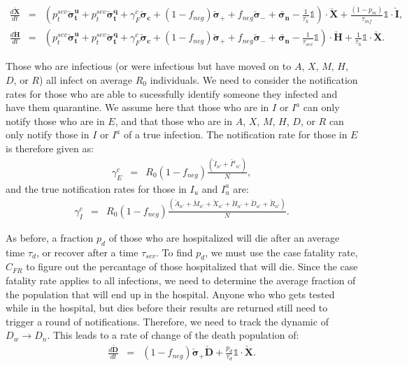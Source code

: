\documentclass[notitlepage, superscriptaddress]{revtex4-2}
\begin{document}
\begin{eqnarray}
%
\frac{d \boldsymbol{\check{X}}}{dt} &=& \left( p^{sev}_{t} \boldsymbol{\check{\sigma}^{u}_{t}} + p^{sev}_{t} \boldsymbol{\check{\sigma}^{q}_{t}} + \gamma^{c}_{F} \boldsymbol{\check{\sigma}_{c}} + (1-f_{neg}) \boldsymbol{\check{\sigma}_{+}} + f_{neg} \boldsymbol{\check{\sigma}_{-}} + \boldsymbol{\check{\sigma_{n}}} - \frac{1}{\tau_{h}} \mathbb{1} \right) \cdot \boldsymbol{\check{X}} + \frac{(1-p_{m})}{\tau_{inf}} \mathbb{1} \cdot \boldsymbol{\check{I}}, \\
% 
\frac{d \boldsymbol{\check{H}}}{dt} &=& \left( p^{sev}_{t} \boldsymbol{\check{\sigma}^{u}_{t}} + p^{sev}_{t} \boldsymbol{\check{\sigma}^{q}_{t}} + \gamma^{c}_{F} \boldsymbol{\check{\sigma}_{c}} + (1-f_{neg}) \boldsymbol{\check{\sigma}_{+}} + f_{neg} \boldsymbol{\check{\sigma}_{-}} + \boldsymbol{\check{\sigma_{n}}} - \frac{1}{\tau_{sev}} \mathbb{1} \right) \cdot \boldsymbol{\check{H}} + \frac{1}{\tau_{h}} \mathbb{1} \cdot \boldsymbol{\check{X}}.
\end{eqnarray}

Those who are infectious (or were infectious but have moved on to $A$, $X$, $M$, $H$, $D$, or $R$) all infect on average $R_{0}$ individuals. We need to consider the notification rates for those who are able to sucessfully identify someone they infected and have them quarantine. We assume here that those who are in $I$ or $I^{a}$ can only notify those who are in $E$, and that those who are in $A$, $X$, $M$, $H$, $D$, or $R$ can only notify those in $I$ or $I^{a}$ of a true infection. The notification rate for those in $E$ is therefore given as:
\begin{eqnarray}
\gamma^{c}_{E} &=& R_{0}(1-f_{neg}) \frac{(\check{I}_{n'} + \check{I^{a}}_{n'})}{N},
\end{eqnarray} 
and the true notification rates for those in $I_{u}$ and $I^{a}_{u}$ are:
\begin{eqnarray}
\gamma^{c}_{I} &=&  R_{0} (1-f_{neg}) \frac{(\check{A}_{n'} + \check{M}_{n'} + \check{X}_{n'} + \check{H}_{n'} + \check{D}_{n'} + \check{R}_{n'} )}{N}.
\end{eqnarray}   

As before, a fraction $p_{d}$ of those who are hospitalized will die after an average time $\tau_{d}$, or recover after a time $\tau_{sev}$. To find $p_{d}$, we must use the case fatality rate, $C_{FR}$ to figure out the percantage of those hospitalized that will die. Since the case fatality rate applies to all infections, we need to determine the average fraction of the population that will end up in the hospital. Anyone who who gets tested while in the hospital, but dies before their results are returned still need to trigger a round of notifications. Therefore, we need to track the dynamic of $D_{w} \rightarrow D_{n}$. This leads to a rate of change of the death population of:
\begin{eqnarray}
\frac{d \boldsymbol{\check{D}}}{dt} &=& (1-f_{neg}) \boldsymbol{\check{\sigma}_{+}} \boldsymbol{\check{D}} +  \frac{p_{d}}{\tau_{d}} \mathbb{1} \cdot \boldsymbol{\check{X}}. 
\end{eqnarray}
\end{document}
